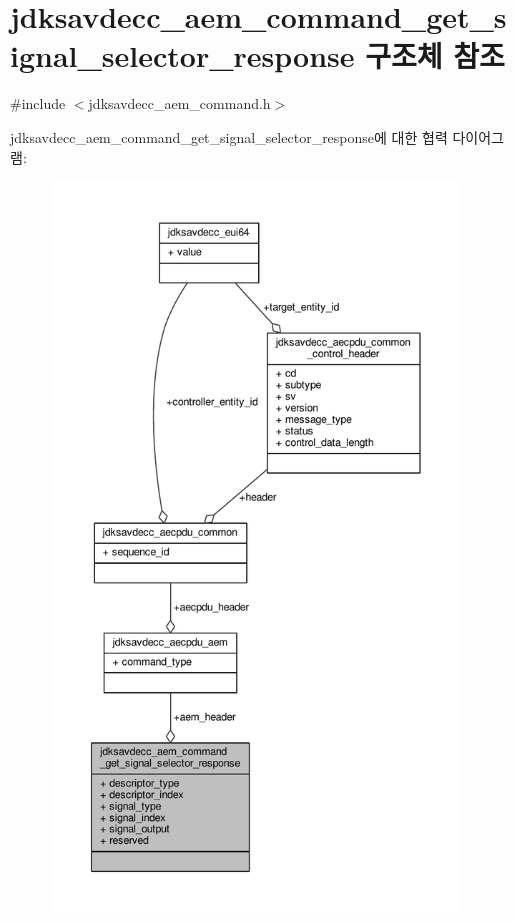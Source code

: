\hypertarget{structjdksavdecc__aem__command__get__signal__selector__response}{}\section{jdksavdecc\+\_\+aem\+\_\+command\+\_\+get\+\_\+signal\+\_\+selector\+\_\+response 구조체 참조}
\label{structjdksavdecc__aem__command__get__signal__selector__response}


{\ttfamily \#include $<$jdksavdecc\+\_\+aem\+\_\+command.\+h$>$}



jdksavdecc\+\_\+aem\+\_\+command\+\_\+get\+\_\+signal\+\_\+selector\+\_\+response에 대한 협력 다이어그램\+:
\nopagebreak
\begin{figure}[H]
\begin{center}
\leavevmode
\includegraphics[height=550pt]{structjdksavdecc__aem__command__get__signal__selector__response__coll__graph}
\end{center}
\end{figure}

